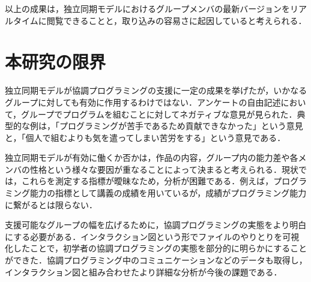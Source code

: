 以上の成果は，独立同期モデルにおけるグループメンバの最新バージョンをリアルタイムに閲覧できることと，取り込みの容易さに起因していると考えられる．


\section{本研究の限界}

独立同期モデルが協調プログラミングの支援に一定の成果を挙げたが，いかなるグループに対しても有効に作用するわけではない．アンケートの自由記述において，グループでプログラムを組むことに対してネガティブな意見が見られた．典型的な例は，「プログラミングが苦手であるため貢献できなかった」という意見と，「個人で組むよりも気を遣ってしまい苦労をする」という意見である．

独立同期モデルが有効に働くか否かは，作品の内容，グループ内の能力差や各メンバの性格という様々な要因が重なることによって決まると考えられる．現状では，これらを測定する指標が曖昧なため，分析が困難である．例えば，プログラミング能力の指標として講義の成績を用いているが，成績がプログラミング能力に繋がるとは限らない．

支援可能なグループの幅を広げるために，協調プログラミングの実態をより明白にする必要がある．インタラクション図という形でファイルのやりとりを可視化したことで，初学者の協調プログラミングの実態を部分的に明らかにすることができた．協調プログラミング中のコミュニケーションなどのデータも取得し，インタラクション図と組み合わせたより詳細な分析が今後の課題である．